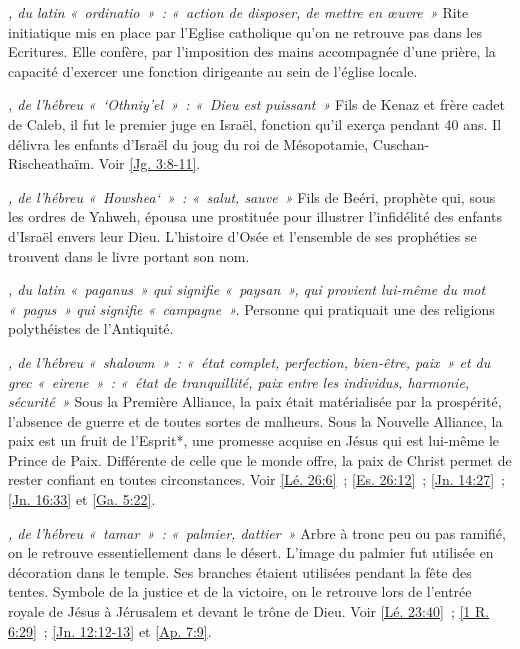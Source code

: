 \begin{multicols}{2}
\textit{, du latin «~ordinatio~»~: «~action de disposer, de mettre en œuvre~»}\newline
Rite initiatique mis en place par l'Eglise catholique qu'on ne retrouve pas dans les Ecritures. Elle confère, par l'imposition des mains accompagnée d'une prière, la capacité d'exercer une fonction dirigeante au sein de l'église locale.

\textit{, de l'hébreu «~`Othniy'el~»~: «~Dieu est puissant~»}\newline
Fils de Kenaz et frère cadet de Caleb, il fut le premier juge en Israël, fonction qu'il exerça pendant 40 ans. Il délivra les enfants d'Israël du joug du roi de Mésopotamie, Cuschan-Rischeathaïm. Voir \vref{Jg. 3:8-11}.

\textit{, de l'hébreu «~Howshea`~»~: «~salut, sauve~»}\newline
Fils de Beéri, prophète qui, sous les ordres de Yahweh, épousa une prostituée pour illustrer l'infidélité des enfants d'Israël envers leur Dieu. L'histoire d'Osée et l'ensemble de ses prophéties se trouvent dans le livre portant son nom.

\textit{, du latin «~paganus~» qui signifie «~paysan~», qui provient lui-même du mot «~pagus~» qui signifie «~campagne~».}\newline
Personne qui pratiquait une des religions polythéistes de l'Antiquité.

\textit{, de l'hébreu «~shalowm~»~: «~état complet, perfection, bien-être, paix~» et du grec «~eirene~»~: «~état de tranquillité, paix entre les individus, harmonie, sécurité~»}\newline
Sous la Première Alliance, la paix était matérialisée par la prospérité, l'absence de guerre et de toutes sortes de malheurs. Sous la Nouvelle Alliance, la paix est un fruit de l'Esprit*, une promesse acquise en Jésus qui est lui-même le Prince de Paix. Différente de celle que le monde offre, la paix de Christ permet de rester confiant en toutes circonstances. Voir \vref{Lé. 26:6}~; \vref{Es. 26:12}~; \vref{Jn. 14:27}~; \vref{Jn. 16:33} et \vref{Ga. 5:22}.

\textit{, de l'hébreu «~tamar~»~: «~palmier, dattier~»}\newline
Arbre à tronc peu ou pas ramifié, on le retrouve essentiellement dans le désert. L'image du palmier fut utilisée en décoration dans le temple. Ses branches étaient utilisées pendant la fête des tentes. Symbole de la justice et de la victoire, on le retrouve lors de l'entrée royale de Jésus à Jérusalem et devant le trône de Dieu. Voir \vref{Lé. 23:40}~; \vref{1 R. 6:29}~; \vref{Jn. 12:12-13} et \vref{Ap. 7:9}.


\end{multicols}
